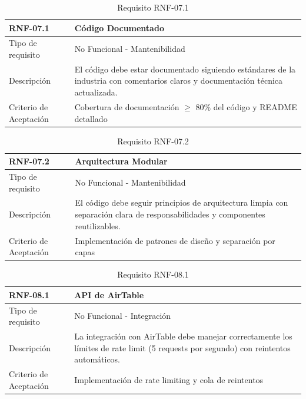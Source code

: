 
\begin{table}[H]
\centering
\begin{tabular}{|p{3cm}|p{10cm}|}
\hline
\rowcolor{tealblue}
{\textbf{RNF-07.1}} & {\textbf{Código Documentado}} \\
\hline
Tipo de requisito & No Funcional - Mantenibilidad \\
\hline
Descripción & El código debe estar documentado siguiendo estándares de la industria con comentarios claros y documentación técnica actualizada. \\
\hline
Criterio de Aceptación & Cobertura de documentación $\geq$ 80\% del código y README detallado \\
\hline
\end{tabular}
\caption{Requisito RNF-07.1}
\end{table}

\begin{table}[H]
\centering
\begin{tabular}{|p{3cm}|p{10cm}|}
\hline
\rowcolor{tealblue}
{\textbf{RNF-07.2}} & {\textbf{Arquitectura Modular}} \\
\hline
Tipo de requisito & No Funcional - Mantenibilidad \\
\hline
Descripción & El código debe seguir principios de arquitectura limpia con separación clara de responsabilidades y componentes reutilizables. \\
\hline
Criterio de Aceptación & Implementación de patrones de diseño y separación por capas \\
\hline
\end{tabular}
\caption{Requisito RNF-07.2}
\end{table}


\begin{table}[H]
\centering
\begin{tabular}{|p{3cm}|p{10cm}|}
\hline
\rowcolor{tealblue}
{\textbf{RNF-08.1}} & {\textbf{API de AirTable}} \\
\hline
Tipo de requisito & No Funcional - Integración \\
\hline
Descripción & La integración con AirTable debe manejar correctamente los límites de rate limit (5 requests por segundo) con reintentos automáticos. \\
\hline
Criterio de Aceptación & Implementación de rate limiting y cola de reintentos \\
\hline
\end{tabular}
\caption{Requisito RNF-08.1}
\end{table}

